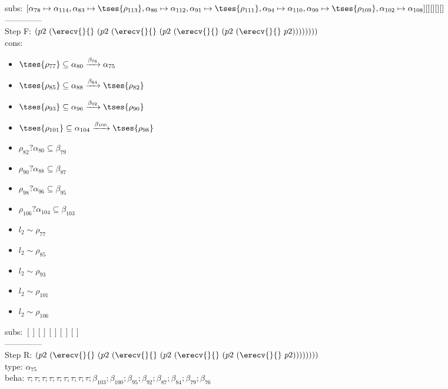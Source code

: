 \documentclass[12pt]{article}
\begin{document}
  subs:  $ [ \alpha_{78}\mapsto\alpha_{114}, \alpha_{83}\mapsto \tses{ \rho_{113}}, \alpha_{86}\mapsto\alpha_{112}, \alpha_{91}\mapsto \tses{ \rho_{111}}, \alpha_{94}\mapsto\alpha_{110}, \alpha_{99}\mapsto \tses{ \rho_{109}}, \alpha_{102}\mapsto\alpha_{108}] [] [] [] [] $  
 \\--------------\\ 
Step F: $ (p2~(\erecv{}{}~(p2~(\erecv{}{}~(p2~(\erecv{}{}~(p2~(\erecv{}{}~p2)))))))) $
 \\ cons: \begin{itemize}
\item $  \tses{ \rho_{77}} \subseteq \alpha_{80} \xrightarrow{\beta_{76}} \alpha_{75} $
\item $  \tses{ \rho_{85}} \subseteq \alpha_{88} \xrightarrow{\beta_{84}}  \tses{ \rho_{82}} $
\item $  \tses{ \rho_{93}} \subseteq \alpha_{96} \xrightarrow{\beta_{92}}  \tses{ \rho_{90}} $
\item $  \tses{ \rho_{101}} \subseteq \alpha_{104} \xrightarrow{\beta_{100}}  \tses{ \rho_{98}} $
\item $ \rho_{82}?\alpha_{80} \subseteq \beta_{79} $
\item $ \rho_{90}?\alpha_{88} \subseteq \beta_{87} $
\item $ \rho_{98}?\alpha_{96} \subseteq \beta_{95} $
\item $ \rho_{106}?\alpha_{104} \subseteq \beta_{103} $
\item $ l_{2} \sim\rho_{77} $
\item $ l_{2} \sim\rho_{85} $
\item $ l_{2} \sim\rho_{93} $
\item $ l_{2} \sim\rho_{101} $
\item $ l_{2} \sim\rho_{106} $
\end{itemize}
 subs:  $ [ ] [] [] [] [] $ 
  \\--------------\\ 
Step R: $ (p2~(\erecv{}{}~(p2~(\erecv{}{}~(p2~(\erecv{}{}~(p2~(\erecv{}{}~p2)))))))) $\\
  type: $ \alpha_{75} $ 
\\  beha: $ \tau; \tau; \tau; \tau; \tau; \tau; \tau; \tau; \tau; \beta_{103}; \beta_{100}; \beta_{95}; \beta_{92}; \beta_{87}; \beta_{84}; \beta_{79}; \beta_{76} $ 
\end{document}
